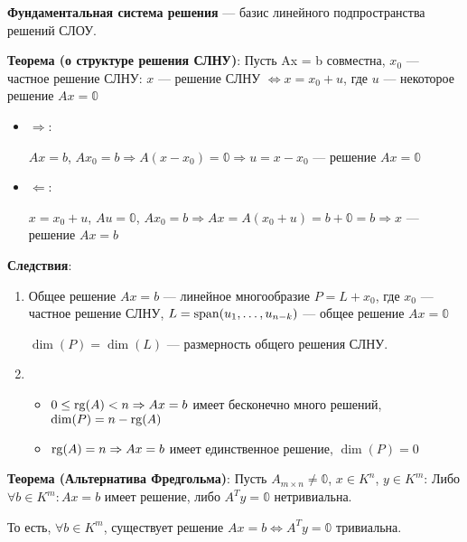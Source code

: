 \textbf{Фундаментальная система решения} --- базис линейного подпространства решений СЛОУ.

\textbf{Теорема (о структуре решения СЛНУ)}: Пусть Ax = b совместна, \(x_0\) --- частное решение СЛНУ: \(x\) --- решение СЛНУ \(\Leftrightarrow x = x_0 + u\), где \(u\) --- некоторое решение \(Ax = \mathbb{0}\)
\begin{itemize}
    \item \(\Rightarrow\):

          \(Ax = b\), \(Ax_0 = b \Rightarrow A(x - x_0) = \mathbb{0} \Rightarrow u = x - x_0\) --- решение \(Ax = \mathbb{0}\)

    \item \(\Leftarrow\):

          \(x = x_0 + u\), \(Au = \mathbb{0}\), \(Ax_0 = b \Rightarrow Ax = A(x_0 + u) = b + \mathbb{0} = b \Rightarrow x\) --- решение \(Ax = b\)
\end{itemize}
\textbf{Следствия}:
\begin{enumerate}
    \item Общее решение \(Ax = b\) --- линейное многообразие \(P = L + x_0\), где \(x_0\) --- частное решение СЛНУ, \(L = \operatorname{span}(u_1, \ldots, u_{n-k})\) --- общее решение \(Ax = \mathbb{0}\)

          \(\dim(P) = \dim(L)\) --- размерность общего решения СЛНУ.

    \item
          \begin{itemize}
              \item \(0 \leq \operatorname{rg}(A) < n \Rightarrow Ax = b\) имеет бесконечно много решений, \(\dim(P) = n - \operatorname{rg}(A)\)

              \item \(\operatorname{rg}(A) = n \Rightarrow Ax = b\) имеет единственное решение, \(\dim(P) = 0\)
          \end{itemize}
\end{enumerate}

\textbf{Теорема (Альтернатива Фредгольма)}: Пусть \(A_{m\times n} \neq \mathbb{0}\), \(x \in K^n\), \(y \in K^m\): Либо \(\forall b \in K^m: Ax = b\) имеет решение, либо \(A^Ty = \mathbb{0}\) нетривиальна.

То есть, \(\forall b \in K^m\), существует решение \(Ax = b \Leftrightarrow A^Ty = \mathbb{0}\) тривиальна.

